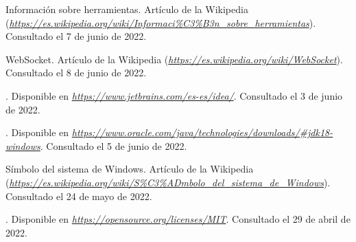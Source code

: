 \begin{thebibliography}{99}
 Información sobre herramientas. Artículo de la Wikipedia ({\it \url{https://es.wikipedia.org/wiki/Informaci%C3%B3n_sobre_herramientas}}). Consultado el 7 de junio de 2022.

 WebSocket. Artículo de la Wikipedia ({\it \url{https://es.wikipedia.org/wiki/WebSocket}}). Consultado el 8 de junio de 2022.

. Disponible en {\it \url{https://www.jetbrains.com/es-es/idea/}}. Consultado el 3 de junio de 2022.

. Disponible en {\it \url{https://www.oracle.com/java/technologies/downloads/#jdk18-windows}}. Consultado el 5 de junio de 2022.

 Símbolo del sistema de Windows. Artículo de la Wikipedia ({\it \url{https://es.wikipedia.org/wiki/S%C3%ADmbolo_del_sistema_de_Windows}}). Consultado el 24 de mayo de 2022.

. Disponible en {\it \url{https://opensource.org/licenses/MIT}}. Consultado el 29 de abril de 2022.
\end{thebibliography}